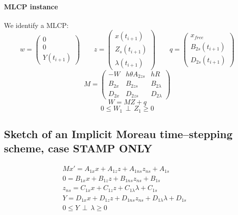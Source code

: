 \paragraph{MLCP instance}
We identify a MLCP:\\

\[w=\left(\begin{array}{c}0\\0\\Y(t_{i+1})\end{array}\right) \qquad
z=\left(\begin{array}{c}x(t_{i+1})\\Z_{s}(t_{i+1})\\ \lambda (t_{i+1})\end{array}\right) \qquad
q=\left(\begin{array}{c}x_{free}\\B_{2s}(t_{i+1})\\ D_{2s} (t_{i+1})\end{array}\right)\]
\[M=\left(\begin{array}{ccc}-W&h \theta A_{2zs}& hR \\B_{2x}&B_{2zs}&B_{2 \lambda} \\D_{2x} &
  D_{2zs} & D_{2 \lambda} \end{array}\right)\]
\[W=MZ+q\]
\[0 \leq W_{1} \, \perp \, Z_{1} \geq 0\]

\newpage

\subsection{Sketch of an Implicit Moreau time--stepping scheme, case STAMP ONLY}
\begin{eqnarray}
Mx'=A_{1x}x +A_{1z}z + A_{1ns}z_{ns}+A_{1s}&\label{eq2stamp}\\
0=B_{1x}x+B_{1z}z + B_{1ns}z_{ns}+B_{1s}&\label{eq3stamp}\\
z_{ns}= C_{1x}x+C_{1z}z+C_{1\lambda}\lambda +C_{1s}&\label{eq4stamp}\\
Y=D_{1x}x +D_{1z}z+D_{1ns}z_{ns}+D_{1\lambda}\lambda+D_{1s}&\label{eq5stamp}\\
0 \leq Y \, \perp \, \lambda \geq 0
\end{eqnarray}


